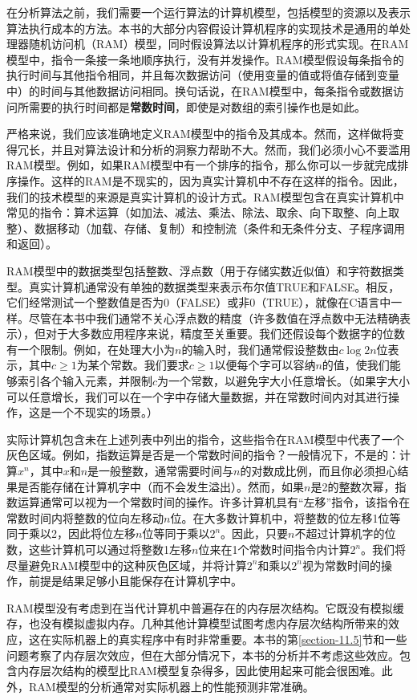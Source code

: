 \documentclass[lang=cn,newtx,10pt,scheme=chinese]{elegantbook}
\begin{document}
在分析算法之前，我们需要一个运行算法的计算机模型，包括模型的资源以及表示算法执行成本的方法。本书的大部分内容假设计算机程序的实现技术是通用的单处理器随机访问机（RAM）模型，同时假设算法以计算机程序的形式实现。在RAM模型中，指令一条接一条地顺序执行，没有并发操作。RAM模型假设每条指令的执行时间与其他指令相同，并且每次数据访问（使用变量的值或将值存储到变量中）的时间与其他数据访问相同。换句话说，在RAM模型中，每条指令或数据访问所需要的执行时间都是\textbf{常数时间}，即使是对数组的索引操作也是如此。

严格来说，我们应该准确地定义RAM模型中的指令及其成本。然而，这样做将变得冗长，并且对算法设计和分析的洞察力帮助不大。然而，我们必须小心不要滥用RAM模型。例如，如果RAM模型中有一个排序的指令，那么你可以一步就完成排序操作。这样的RAM是不现实的，因为真实计算机中不存在这样的指令。因此，我们的技术模型的来源是真实计算机的设计方式。RAM模型包含在真实计算机中常见的指令：算术运算（如加法、减法、乘法、除法、取余、向下取整、向上取整）、数据移动（加载、存储、复制）和控制流（条件和无条件分支、子程序调用和返回）。

RAM模型中的数据类型包括整数、浮点数（用于存储实数近似值）和字符数据类型。真实计算机通常没有单独的数据类型来表示布尔值TRUE和FALSE。相反，它们经常测试一个整数值是否为0（FALSE）或非0（TRUE），就像在C语言中一样。尽管在本书中我们通常不关心浮点数的精度（许多数值在浮点数中无法精确表示），但对于大多数应用程序来说，精度至关重要。我们还假设每个数据字的位数有一个限制。例如，在处理大小为$n$的输入时，我们通常假设整数由$c\log 2n$位表示，其中$c \ge 1$为某个常数。我们要求$c \ge 1$以便每个字可以容纳$n$的值，使我们能够索引各个输入元素，并限制$c$为一个常数，以避免字大小任意增长。（如果字大小可以任意增长，我们可以在一个字中存储大量数据，并在常数时间内对其进行操作，这是一个不现实的场景。）

实际计算机包含未在上述列表中列出的指令，这些指令在RAM模型中代表了一个灰色区域。例如，指数运算是否是一个常数时间的指令？一般情况下，不是的：计算$x^n$，其中$x$和$n$是一般整数，通常需要时间与$n$的对数成比例，而且你必须担心结果是否能存储在计算机字中（而不会发生溢出）。然而，如果$n$是2的整数次幂，指数运算通常可以视为一个常数时间的操作。许多计算机具有``左移''指令，该指令在常数时间内将整数的位向左移动$n$位。在大多数计算机中，将整数的位左移1位等同于乘以2，因此将位左移$n$位等同于乘以$2^n$。因此，只要$n$不超过计算机字的位数，这些计算机可以通过将整数1左移$n$位来在1个常数时间指令内计算$2^n$。我们将尽量避免RAM模型中的这种灰色区域，并将计算$2^n$和乘以$2^n$视为常数时间的操作，前提是结果足够小且能保存在计算机字中。

RAM模型没有考虑到在当代计算机中普遍存在的内存层次结构。它既没有模拟缓存，也没有模拟虚拟内存。几种其他计算模型试图考虑内存层次结构所带来的效应，这在实际机器上的真实程序中有时非常重要。本书的第\ref{section-11.5}节和一些问题考察了内存层次效应，但在大部分情况下，本书的分析并不考虑这些效应。包含内存层次结构的模型比RAM模型复杂得多，因此使用起来可能会很困难。此外，RAM模型的分析通常对实际机器上的性能预测非常准确。
\end{document}
